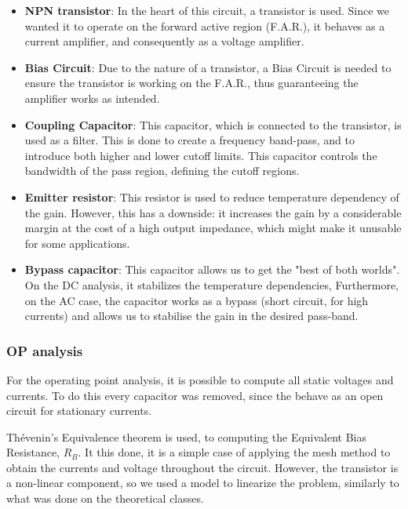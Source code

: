 \begin{itemize}
    \item \textbf{NPN transistor}: In the heart of this circuit, a transistor is used. Since we wanted it to operate on the forward active region (F.A.R.), it behaves as a current amplifier, and consequently as a voltage amplifier.
    \item \textbf{Bias Circuit}: Due to the nature of a transistor, a Bias Circuit is needed to ensure the transistor is working on the F.A.R., thus guaranteeing the amplifier works as intended.
    \item \textbf{Coupling Capacitor}: This capacitor, which is connected to the transistor, is used as a filter. This is done to create a frequency band-pass, and to introduce both higher and lower cutoff limits. This capacitor controls the bandwidth of the pass region, defining the cutoff regions.
    \item \textbf{Emitter resistor}: This resistor is used to reduce temperature dependency of the gain. However, this has a downside: it increases the gain by a considerable margin at the cost of a high output impedance, which might make it unusable for some applications.
    \item \textbf{Bypass capacitor}: This capacitor allows us to get the "best of both worlds". On the DC analysis, it stabilizes the temperature dependencies, Furthermore, on the AC case, the capacitor works as a bypass (short circuit, for high currents) and allows us to stabilise the gain in the desired pass-band. 

\end{itemize}


\subsubsection*{OP analysis}

\indent

For the operating point analysis, it is possible to compute all static voltages and currents. To do this every capacitor was removed, since the behave as an open circuit for stationary currents.

Thévenin's Equivalence theorem is used, to computing the Equivalent Bias Resistance, $R_B$. It this done, it is a simple case of applying the mesh method to obtain the currents and voltage throughout the circuit. However, the transistor is a non-linear component, so we used a model to linearize the problem, similarly to what was done on the theoretical classes.



